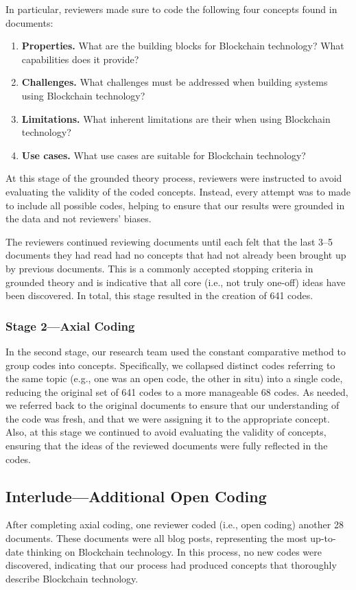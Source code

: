 In particular, reviewers made sure to code the following four concepts found in documents:
\begin{enumerate}
	\item \textbf{Properties.} What are the building blocks for Blockchain technology? What capabilities does it provide?
	\item \textbf{Challenges.} What challenges must be addressed when building systems using Blockchain technology?
	\item \textbf{Limitations.} What inherent limitations are their when using Blockchain technology?
	\item \textbf{Use cases.} What use cases are suitable for Blockchain technology?
\end{enumerate}

At this stage of the grounded theory process, reviewers were instructed to avoid evaluating the validity of the coded concepts.
Instead, every attempt was to made to include all possible codes, helping to ensure that our results were grounded in the data and not reviewers' biases.

The reviewers continued reviewing documents until each felt that the last 3--5 documents they had read had no concepts that had not already been brought up by previous documents.
This is a commonly accepted stopping criteria in grounded theory and is indicative that all core (i.e., not truly one-off) ideas have been discovered.
In total, this stage resulted in the creation of 641 codes.

\subsubsection{Stage 2---Axial Coding}
In the second stage, our research team used the constant comparative method to group codes into concepts.
Specifically, we collapsed distinct codes referring to the same topic (e.g., one was an open code, the other in situ) into a single code, reducing the original set of 641 codes to a more manageable 68 codes.
As needed, we referred back to the original documents to ensure that our understanding of the code was fresh, and that we were assigning it to the appropriate concept.
Also, at this stage we continued to avoid evaluating the validity of concepts, ensuring that the ideas of the reviewed documents were fully reflected in the codes.

\subsection{Interlude---Additional Open Coding}
After completing axial coding, one reviewer coded (i.e., open coding) another 28 documents.
These documents were all blog posts, representing the most up-to-date thinking on Blockchain technology.
In this process, no new codes were discovered, indicating that our process had produced concepts that thoroughly describe Blockchain technology.

